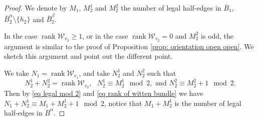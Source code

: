 \documentclass[11pt,a4paper]{article}
\theoremstyle{definition}
\theoremstyle{remark}
\numberwithin{equation}{section}
\begin{document}
\begin{proof}

    We denote by $M_1$, $M_2^1$ and $M_2^2$ the number of legal half-edges in $\bar B_1$, $\bar B_2^\alpha \setminus \{h_2\}$ and $\bar B_2^\beta$.
    
    In the case $\operatorname{rank} \mathcal W_{v_2}\ge 1$, or in the case $\operatorname{rank} \mathcal W_{v_2}=0$ and $M_2^2$ is odd, the argument is similar to the proof of Proposition \ref{prop: orientation open open}. We sketch this argument and point out the different point.

    
    We take $N_1=\operatorname{rank} \mathcal W_{v_1}$, and take $N_2^1$ and $N_2^2$ such that 
    \begin{equation}\label{eq pairty in proof of separating orientation}
    N_2^1+N_2^2=\operatorname{rank} \mathcal W_{v_2}, \text{ } N_2^1\equiv M_2^1 \mod 2,  \text{ and } N_2^2\equiv M_2^2+1 \mod 2.
    \end{equation}
    Then by \eqref{eq legal mod 2} and \eqref{eq rank of witten bundle} we have $N_1+N_2^1 \equiv M_1+M_2^1+1 \mod 2$, notice that $M_1+M_2^1$ is the number of legal half-edges in $\bar B^\alpha$.
    

\end{proof}
\end{document}
